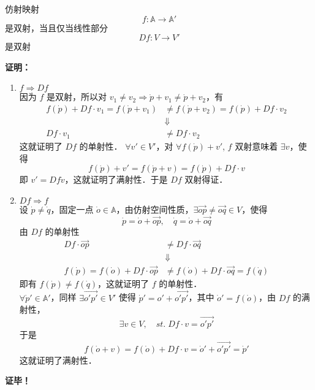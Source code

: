 \begin{theorem}{}\label{AfSp_the1}
仿射映射
\begin{equation}
f:\mathbb A\rightarrow\mathbb A' 
\end{equation}
是双射，当且仅当线性部分
\begin{equation}
Df:V\rightarrow V'
\end{equation}
是双射
\end{theorem}
\textbf{证明：}
\begin{enumerate}
\item $f\Rightarrow Df$\\

因为 $f$ 是双射，所以对 $v_1\neq v_2\Rightarrow \dot p+v_1\neq\dot p+v_2$，有
\begin{equation}
\begin{aligned}
f(\dot p)+Df\cdot v_1=f(\dot p+v_1)&\neq f(\dot p+v_2)=f(\dot p)+Df\cdot v_2\\
&\Downarrow\\
Df\cdot v_1&\neq Df\cdot v_2
\end{aligned}
\end{equation}
这就证明了 $Df$ 的单射性．  $\forall  v'\in V'$，对 $\forall f(\dot p)+v'$, $f$ 双射意味着 $\exists v$，使得 
\begin{equation}
f(\dot p)+v'=f(\dot p+v)=f(\dot p)+Df\cdot v
\end{equation}
即 $v'=Df\dot v$，这就证明了满射性．于是 $Df$ 双射得证．
\item $Df\Rightarrow f$\\
设 $\dot p\neq \dot q$，固定一点 $\dot o\in \mathbb A$，由仿射空间性质，$\exists \overrightarrow{op}\neq\overrightarrow{oq}\in V$，使得 
\begin{equation}
\dot p=\dot o+\overrightarrow{op},\quad\dot q=\dot o+\overrightarrow{oq} 
\end{equation}
由 $Df$ 的单射性
\begin{equation}
\begin{aligned}
Df\cdot \overrightarrow{op}&\neq Df\cdot \overrightarrow{oq}\\
&\Downarrow\\
f(\dot p)=f(\dot o)+Df\cdot \overrightarrow{op}&\neq f(\dot o)+Df\cdot \overrightarrow{oq}=f(\dot q)
\end{aligned}
\end{equation}
即有 $f(\dot p)\neq f(\dot q)$，这就证明了 $f$ 的单射性．\\

$\forall \dot p'\in\mathbb A'$，同样 $\exists\overrightarrow{o'p'}\in V'$ 使得 $\dot p'=o'+\overrightarrow{o'p'}$，其中 $\dot o'=f(\dot o)$，由 $Df$ 的满射性，
\begin{equation}
\exists v\in V,\quad st.\; Df\cdot v=\overrightarrow{o'p'}
\end{equation}
于是
\begin{equation}
f(\dot o+v)=f(\dot o)+Df\cdot v=\dot o'+\overrightarrow{o'p'}=\dot p'
\end{equation}
这就证明了满射性．
\end{enumerate}
\textbf{证毕！}

